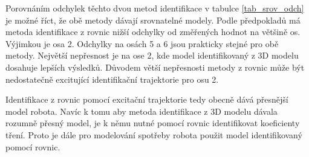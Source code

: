 Porovnáním odchylek těchto dvou metod identifikace v tabulce \ref{tab_srov_odch} je možné říct, že obě metody dávají srovnatelné modely. Podle předpokladů má metoda identifikace z rovnic nižší odchylky od změřených hodnot na většině os. Výjimkou je osa 2. Odchylky na osách 5 a 6 jsou prakticky stejné pro obě metody. Největší nepřesnost je na ose 2, kde model identifikovaný z 3D modelu dosahuje lepších výsledků. Důvodem větší nepřesnosti metody z rovnic může být nedostatečně excitující identifikační trajektorie pro osu 2.

Identifikace z rovnic pomocí excitační trajektorie tedy obecně dává přesnější model robota. Navíc k tomu aby metoda identifikace z 3D modelu dávala rozumně přesný model, je k němu nutné pomocí rovnic identifikovat koeficienty tření. Proto je dále pro modelování spotřeby robota použit model identifikovaný pomocí rovnic.